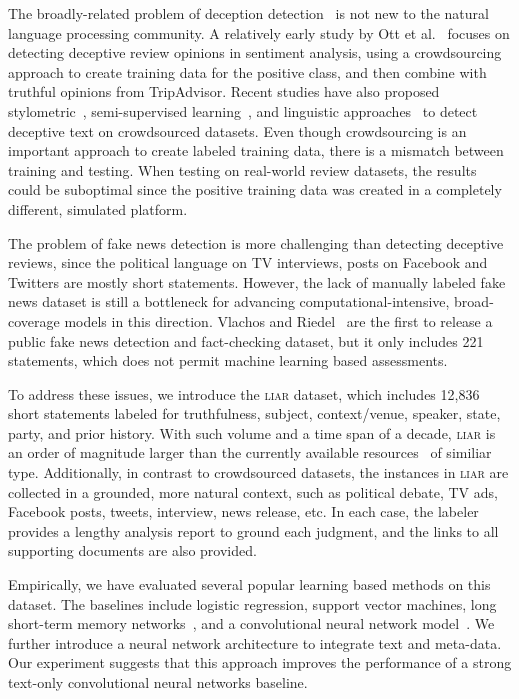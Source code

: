 \documentclass[11pt,a4paper]{article}
\begin{document}
The broadly-related problem of deception detection~\cite{Mihalcea:2009:LDE:1667583.1667679} is not new to the natural language processing community. A relatively early study by Ott et al.~
focuses on detecting deceptive review opinions in sentiment analysis, using a crowdsourcing approach to create training data for the positive class, and then combine with truthful opinions from TripAdvisor. Recent studies have also proposed stylometric~\cite{feng2012syntactic}, semi-supervised learning~\cite{haideceptive}, 
and linguistic approaches~\cite{perez2015experiments} to detect deceptive text on crowdsourced datasets.
Even though crowdsourcing is an important approach to create labeled training data, there is a mismatch between training and testing. When testing on real-world review datasets, the results could be suboptimal since the positive training data was created in a completely different, simulated platform. 

The problem of fake news detection is more challenging than detecting deceptive reviews,
since the political language on TV interviews, posts on Facebook and Twitters are mostly short statements. However, the lack of manually labeled fake news dataset is still a bottleneck for advancing computational-intensive, broad-coverage models in this direction. Vlachos and Riedel~ are the first to release a public fake news detection and fact-checking dataset, but it only includes 221 statements, which does not permit machine learning based assessments.

To address these issues, we introduce the \textsc{liar} dataset, which includes 12,836 short statements labeled for truthfulness, subject, context/venue, speaker, state, party, and prior history. With such volume and a time span of a decade, \textsc{liar} is an order of magnitude larger than the currently available resources~\cite{vlachos2014fact,ferreira2016emergent} of similiar type. Additionally, in contrast to crowdsourced datasets, the instances in \textsc{liar} are collected in a grounded, more natural context, such as political debate, TV ads, Facebook posts, tweets, interview, news release, etc. In each case, the labeler provides a lengthy analysis report to ground each judgment, and the links to all supporting documents are also provided. 

Empirically, we have evaluated several popular learning based methods on this dataset. The baselines include logistic regression, support vector machines, long short-term memory networks~\cite{hochreiter1997long}, and a convolutional neural network model~\cite{kim:2014:EMNLP2014}. We further introduce a neural network architecture to integrate text and meta-data.
Our experiment suggests that this approach improves the performance of a strong text-only convolutional neural networks baseline. 
\end{document}
